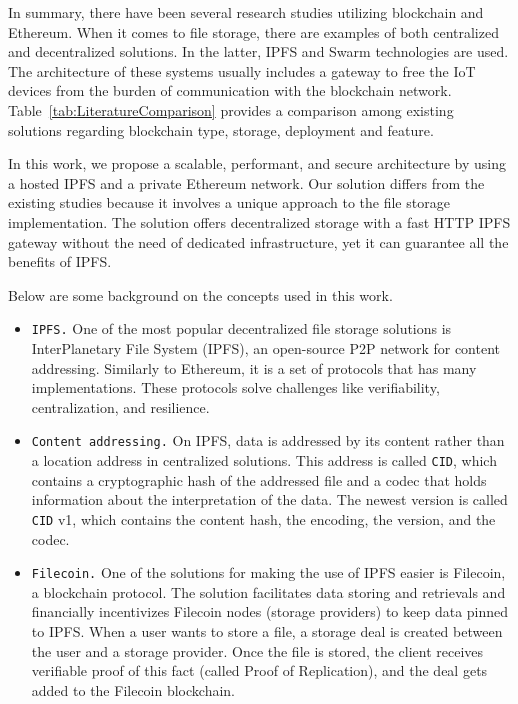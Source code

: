 \documentclass[conference]{IEEEtran}
\begin{document}

In summary, there have been several research studies utilizing blockchain and Ethereum. When it comes to file storage, there are examples of both centralized and decentralized solutions. In the latter, IPFS and Swarm technologies are used. The architecture of these systems usually includes a gateway to free the IoT devices from the burden of communication with the blockchain network. Table~\ref{tab:LiteratureComparison} provides a comparison among existing solutions regarding blockchain type, storage, deployment and feature.

In this work, we propose a scalable, performant, and secure architecture by using a hosted IPFS and a private Ethereum network. Our solution differs from the existing studies because it involves a unique approach to the file storage implementation. The solution offers decentralized storage with a fast HTTP IPFS gateway without the need of dedicated infrastructure, yet it can guarantee all the benefits of IPFS. 

Below are some background on the concepts used in this work.

\begin{itemize}
\item \texttt{IPFS.} One of the most popular decentralized file storage solutions is  InterPlanetary File System (IPFS), an open-source P2P network for content addressing. Similarly to Ethereum, it is a set of protocols that has many implementations. These protocols solve challenges like verifiability, centralization, and resilience.
    
\item \texttt{Content addressing.} On IPFS, data is addressed by its content rather than a location address in centralized solutions. This address is called \texttt{CID}, which contains a cryptographic hash of the addressed file and a codec that holds information about the interpretation of the data. The newest version is called \texttt{CID} v1, which contains the content hash, the encoding, the version, and the codec.

\item \texttt{Filecoin.} One of the solutions for making the use of IPFS easier is Filecoin, a blockchain protocol. The solution facilitates data storing and retrievals and financially incentivizes Filecoin nodes (storage providers) to keep data pinned to IPFS. When a user wants to store a file, a storage deal is created between the user and a storage provider. Once the file is stored, the client receives verifiable proof of this fact (called Proof of Replication), and the deal gets added to the Filecoin blockchain. 
\end{itemize}
\end{document}
